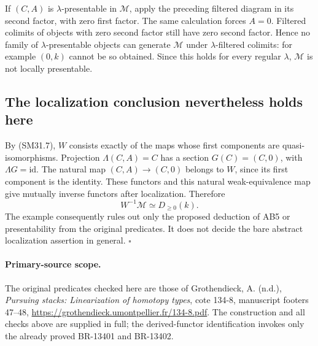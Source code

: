 If \((C,A)\) is \(\lambda\)-presentable in \(\mathcal M\),
apply the preceding filtered diagram in its second factor,
with zero first factor.  The same calculation forces \(A=0\).
Filtered colimits of objects with zero second factor still
have zero second factor.  Hence no family of
\(\lambda\)-presentable objects can generate \(\mathcal M\)
under \(\lambda\)-filtered colimits: for example \((0,k)\)
cannot be so obtained.  Since this holds for every regular
\(\lambda\), \(\mathcal M\) is not locally presentable.

\subsection{The localization conclusion nevertheless holds here}
By (SM31.7), \(W\) consists exactly of the maps whose first
components are quasi-isomorphisms.  Projection
\(\Lambda(C,A)=C\) has a section \(G(C)=(C,0)\), with
\(\Lambda G=\mathrm{id}\).  The natural map
\((C,A)\to(C,0)\) belongs to \(W\), since its first component
is the identity.  These functors and this natural weak-equivalence
map give mutually inverse functors after localization.  Therefore
\[
                W^{-1}\mathcal M\simeq D_{\ge0}(k).
\]
The example consequently rules out only the proposed deduction
of AB5 or presentability from the original predicates.  It does
not decide the bare abstract localization assertion in general.
\(\square\)

\paragraph{Primary-source scope.}
The original predicates checked here are those of
Grothendieck, A. (n.d.), \emph{Pursuing stacks: Linearization
of homotopy types}, cote 134-8, manuscript footers 47--48,
\url{https://grothendieck.umontpellier.fr/134-8.pdf}.
The construction and all checks above are supplied in full;
the derived-functor identification invokes only the already
proved BR-13401 and BR-13402.

